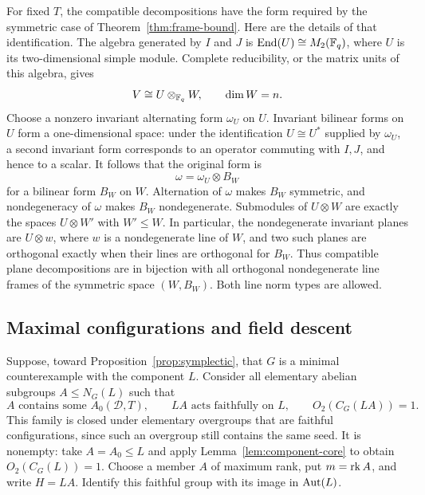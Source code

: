 For fixed $T$, the compatible decompositions have the form required
by the symmetric case of Theorem~\ref{thm:frame-bound}.  Here are the
details of that identification.  The algebra generated by $I$ and $J$
is $\operatorname{End}(U)\cong M_2(\mathbb F_q)$, where $U$ is its two-dimensional simple
module.  Complete reducibility, or the matrix units of this algebra,
gives
\begin{equation}\label{eq:symp-multiplicity}
V\cong U\otimes_{\mathbb F_q} W,\qquad \dim W=n.
\end{equation}
Choose a nonzero invariant alternating form $\omega_U$ on $U$.
Invariant bilinear forms on $U$ form a one-dimensional space: under
the identification $U\cong U^*$ supplied by $\omega_U$, a second
invariant form corresponds to an operator commuting with $I,J$,
and hence to a scalar.  It follows that the original form is
\[
\omega=\omega_U\otimes B_W
\]
for a bilinear form $B_W$ on $W$.  Alternation of $\omega$ makes
$B_W$ symmetric, and nondegeneracy of $\omega$ makes $B_W$
nondegenerate.  Submodules of $U\otimes W$ are exactly the spaces
$U\otimes W'$ with $W'\leq W$.  In particular, the nondegenerate
invariant planes are $U\otimes w$, where $w$ is a nondegenerate line
of $W$, and two such planes are orthogonal exactly when their lines
are orthogonal for $B_W$.  Thus compatible plane decompositions are
in bijection with all orthogonal nondegenerate line frames of the
symmetric space $(W,B_W)$.  Both line norm types are allowed.

\subsection{Maximal configurations and field descent}

Suppose, toward Proposition~\ref{prop:symplectic}, that $G$ is a
minimal counterexample with the component $L$.  Consider all elementary
abelian subgroups $A\leq N_G(L)$ such that
\begin{equation}\label{eq:symp-configurations}
A\text{ contains some }A_0(\mathcal D,T),\qquad
LA\text{ acts faithfully on }L,\qquad O_2(C_G(LA))=1.
\end{equation}
This family is closed under elementary overgroups that are faithful
configurations, since such an overgroup still contains the same seed.
It is nonempty: take $A=A_0\leq L$ and apply
Lemma~\ref{lem:component-core} to obtain $O_2(C_G(L))=1$.
Choose a member $A$ of maximum rank, put $m=\operatorname{rk} A$, and write
$H=LA$.  Identify this faithful group with its image in $\operatorname{Aut}(L)$.

